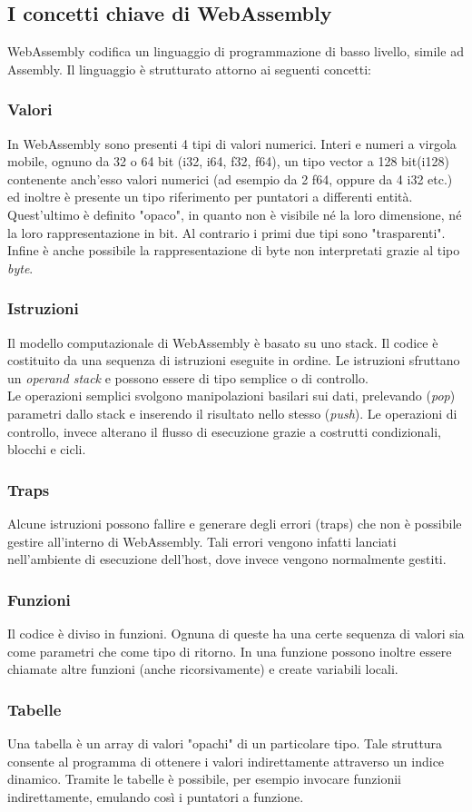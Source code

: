 \newpage
\subsection{I concetti chiave di WebAssembly}
WebAssembly codifica un linguaggio di programmazione di basso livello, simile ad Assembly. Il linguaggio è strutturato attorno ai seguenti concetti:

\subsubsection{Valori}
In WebAssembly sono presenti 4 tipi di valori numerici. Interi e numeri a virgola mobile, ognuno da 32 o 64 bit (i32, i64, f32, f64), un tipo vector a 128 bit(i128) contenente anch'esso valori numerici (ad esempio da 2 f64, oppure da 4 i32 etc.) ed inoltre è presente un tipo riferimento per puntatori a differenti entità. 
\\Quest'ultimo è definito "opaco", in quanto non è visibile né la loro dimensione, né la loro rappresentazione in bit. Al contrario i primi due tipi sono "trasparenti".
\\Infine è anche possibile la rappresentazione di byte non interpretati grazie al tipo \emph{byte}.
\subsubsection{Istruzioni}
Il modello computazionale di WebAssembly è basato su uno stack. Il codice è costituito da una sequenza di istruzioni eseguite in ordine. Le istruzioni sfruttano un \emph{operand stack} e possono essere di tipo semplice o di controllo.
\\Le operazioni semplici svolgono manipolazioni basilari sui dati, prelevando (\emph{pop}) parametri dallo stack e inserendo il risultato nello stesso (\emph{push}). Le operazioni di controllo, invece alterano il flusso di esecuzione grazie a costrutti condizionali, blocchi e cicli.
\subsubsection{Traps} 
Alcune istruzioni possono fallire e generare degli errori (traps) che non è possibile gestire all'interno di WebAssembly. Tali errori vengono infatti lanciati nell'ambiente di esecuzione dell'host, dove invece vengono normalmente gestiti.
\subsubsection{Funzioni}
Il codice è diviso in funzioni. Ognuna di queste ha una certe sequenza di valori sia come parametri che come tipo di ritorno. In una funzione possono inoltre essere chiamate altre funzioni (anche ricorsivamente) e create variabili locali.
\newpage\subsubsection{Tabelle}
Una tabella è un array di valori "opachi" di un particolare tipo. Tale struttura consente al programma di ottenere i valori indirettamente attraverso un indice dinamico. Tramite le tabelle è possibile, per esempio invocare funzionii indirettamente, emulando così i puntatori a funzione.
